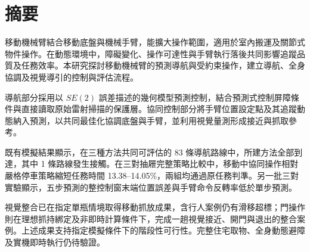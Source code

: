 \chapter*{摘要}

移動機械臂結合移動底盤與機械手臂，能擴大操作範圍，適用於室內搬運及關節式物件操作。在動態環境中，障礙變化、操作可達性與手臂執行落後共同影響追蹤品質及任務效率。本研究探討移動機械臂的預測導航與受約束操作，建立導航、全身協調及視覺導引的控制與評估流程。

導航部分採用以 \(SE(2)\) 誤差描述的幾何模型預測控制，結合預測式控制屏障條件與直接讀取原始雷射掃描的保護層。協同控制部分將手臂位置設定點及其追蹤動態納入預測，以共同最佳化協調底盤與手臂，並利用視覺量測形成接近與抓取參考。

既有模擬結果顯示，在三種方法共同可評估的 83 條導航路線中，所建方法全部到達，其中 1 條路線發生接觸。在三對抽屜完整策略比較中，移動中協同操作相對嚴格停車策略縮短任務時間 13.38--14.05\%，兩組均通過原任務判準。另一批三對實驗顯示，五步預測的整控制窗末端位置誤差與手臂命令反轉率低於單步預測。

視覺整合已在指定單瓶情境取得移動抓放成果，含行人案例仍有滑移超標；門操作則在理想抓持綁定及非即時計算條件下，完成一趟視覺接近、開門與退出的整合案例。上述成果支持指定模擬條件下的階段性可行性。完整住宅取物、全身動態避障及實機即時執行仍待驗證。

